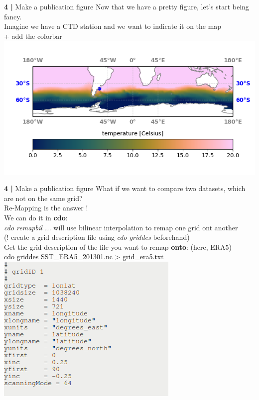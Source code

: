 \begin{frame}{\textbf{4 |} Make a publication figure} 
    Now that we have a pretty figure, let's start being fancy.\\
        \vspace{0.5cm}
    Imagine we have a CTD station and we want to indicate it on the map\\
    + add the colorbar\\
        \vspace{0.5cm}
    \includegraphics[scale=0.45]{images/script2_fig4.png}
\end{frame}


\begin{frame}{\textbf{4 |} Make a publication figure} 
    What if we want to compare two datasets, which are not on the same grid? \\
        \vspace{0.5cm}
    Re-Mapping is the answer !\\
        \vspace{0.5cm}
    We can do it in \textbf{cdo}: \\
    \textit{cdo remapbil ...} will use bilinear interpolation to remap one grid ont another \\
    (! create a grid description file using \textit{cdo griddes} beforehand)\\
        \vspace{0.5cm}
    Get the grid description of the file you want to remap \textbf{onto}: (here, ERA5)\\
    \textcolor{black}{cdo griddes SST\_ERA5\_201301.nc > grid\_era5.txt}\\
    \includegraphics[scale=0.35]{images/Script3_step1.png}
\end{frame}
  
